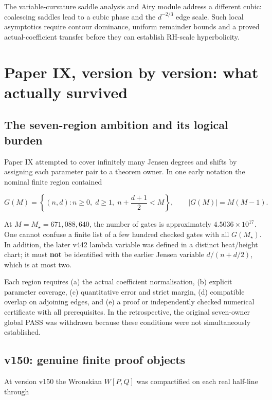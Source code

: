 \documentclass[
  10pt,
  a4paper,
  10pt,
  oneside,
  openany]{book}
\begin{document}
The variable-curvature saddle analysis and Airy module address a
different cubic: coalescing saddles lead to a cubic phase and the
\(d^{-2/3}\) edge scale. Such local asymptotics require contour
dominance, uniform remainder bounds and a proved actual-coefficient
transfer before they can establish RH-scale hyperbolicity.

\section{Paper IX, version by version: what actually
survived}\label{paper-ix-version-by-version-what-actually-survived}

\subsection{The seven-region ambition and its logical
burden}\label{the-seven-region-ambition-and-its-logical-burden}

Paper IX attempted to cover infinitely many Jensen degrees and shifts by
assigning each parameter pair to a theorem owner. In one early notation
the nominal finite region contained

\[
G(M)=\left\{(n,d):n\ge0,\;d\ge1,\;
 n+\frac{d+1}{2}<M\right\},\qquad |G(M)|=M(M-1).
\tag{S4.1}\label{eq:S4.1}
\]

At \(M=M_\star=671{,}088{,}640\), the number of gates is approximately
\(4.5036\times10^{17}\). One cannot confuse a finite list of a few
hundred checked gates with all \(G(M_\star)\). In addition, the later
v442 lambda variable was defined in a distinct heat/height chart; it
must \textbf{not} be identified with the earlier Jensen variable
\(d/(n+d/2)\), which is at most two.

Each region requires (a) the actual coefficient normalisation, (b)
explicit parameter coverage, (c) quantitative error and strict margin,
(d) compatible overlap on adjoining edges, and (e) a proof or
independently checked numerical certificate with all prerequisites. In
the retrospective, the original seven-owner global PASS was withdrawn
because these conditions were not simultaneously established.

\subsection{v150: genuine finite proof
objects}\label{v150-genuine-finite-proof-objects}

At version v150 the Wronskian \(W[P,Q]\) was compactified on each real
half-line through
\end{document}
